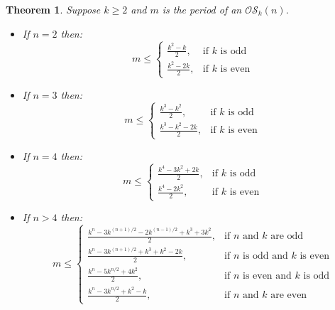 \documentclass[10pt,a4paper]{amsart}
\newtheorem{theorem}{Theorem}
\begin{document}
\begin{theorem} \label{theorem:OS_bound_4}
Suppose $k\geq2$ and $m$ is the period of an $\mathcal{OS}_k(n)$.
\begin{itemize}
\item[i)] If $n=2$ then:
\[ m \leq \begin{cases}
\frac{k^2-k}{2}, & \text{if $k$ is odd} \\
\frac{k^2-2k}{2}, & \text{if $k$ is even}
\end{cases} \]
\item[ii)] If $n=3$ then:
\[ m \leq \begin{cases}
\frac{k^3-k^2}{2}, & \text{if $k$ is odd} \\
\frac{k^3-k^2-2k}{2}, & \text{if $k$ is even}
\end{cases} \]
\item[iii)] If $n=4$ then:
\[ m \leq \begin{cases}
\frac{k^4-3k^2+2k}{2}, & \text{if $k$ is odd} \\
\frac{k^4-2k^2}{2}, & \text{if $k$ is even}
\end{cases}\]
\item[iv)] If $n>4$ then:
\[ m \leq \begin{cases}
\frac{k^n-3k^{(n+1)/2}-2k^{(n-1)/2}+k^3+3k^2}{2}, & \text{if $n$ and $k$ are odd} \\
\frac{k^n-3k^{(n+1)/2}+k^3+k^2-2k}{2}, & \text{if $n$ is odd and $k$ is even} \\
\frac{k^n-5k^{n/2}+4k^2}{2}, & \text{if $n$ is even and $k$ is odd} \\
\frac{k^n-3k^{n/2}+k^2-k}{2}, & \text{if $n$ and $k$ are even}
\end{cases}\]

\end{itemize}

\end{theorem}
\end{document}

